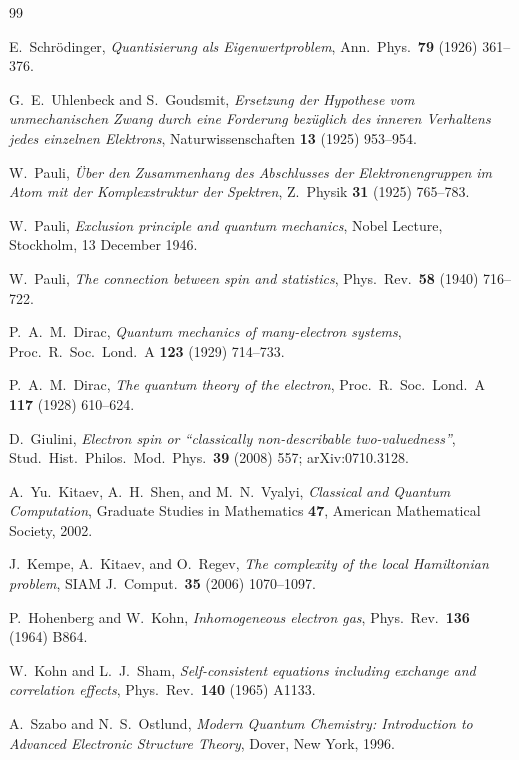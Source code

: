 \documentclass[11pt]{article}
\begin{document}
\begin{thebibliography}{99}

 E.~Schr\"odinger, \emph{Quantisierung als Eigenwertproblem},
  Ann.\ Phys.\ \textbf{79} (1926) 361--376.

 G.~E.~Uhlenbeck and S.~Goudsmit, \emph{Ersetzung der Hypothese
  vom unmechanischen Zwang durch eine Forderung bez\"uglich des inneren Verhaltens jedes einzelnen
  Elektrons}, Naturwissenschaften \textbf{13} (1925) 953--954.

 W.~Pauli, \emph{\"Uber den Zusammenhang des Abschlusses der
  Elektronengruppen im Atom mit der Komplexstruktur der Spektren}, Z.~Physik \textbf{31} (1925)
  765--783.

 W.~Pauli, \emph{Exclusion principle and quantum mechanics}, Nobel Lecture,
  Stockholm, 13 December 1946.

 W.~Pauli, \emph{The connection between spin and statistics},
  Phys.\ Rev.\ \textbf{58} (1940) 716--722.

 P.~A.~M.~Dirac, \emph{Quantum mechanics of many-electron systems},
  Proc.\ R.\ Soc.\ Lond.\ A \textbf{123} (1929) 714--733.

 P.~A.~M.~Dirac, \emph{The quantum theory of the electron},
  Proc.\ R.\ Soc.\ Lond.\ A \textbf{117} (1928) 610--624.

 D.~Giulini, \emph{Electron spin or ``classically non-describable
  two-valuedness''}, Stud.\ Hist.\ Philos.\ Mod.\ Phys.\ \textbf{39} (2008) 557;
  arXiv:0710.3128.

 A.~Yu.~Kitaev, A.~H.~Shen, and M.~N.~Vyalyi, \emph{Classical and
  Quantum Computation}, Graduate Studies in Mathematics \textbf{47}, American Mathematical
  Society, 2002.

 J.~Kempe, A.~Kitaev, and O.~Regev, \emph{The complexity of the
  local Hamiltonian problem}, SIAM J.\ Comput.\ \textbf{35} (2006) 1070--1097.

 P.~Hohenberg and W.~Kohn, \emph{Inhomogeneous electron gas},
  Phys.\ Rev.\ \textbf{136} (1964) B864.

 W.~Kohn and L.~J.~Sham, \emph{Self-consistent equations including exchange and
  correlation effects}, Phys.\ Rev.\ \textbf{140} (1965) A1133.

 A.~Szabo and N.~S.~Ostlund, \emph{Modern Quantum Chemistry: Introduction
  to Advanced Electronic Structure Theory}, Dover, New York, 1996.


\end{thebibliography}
\end{document}
